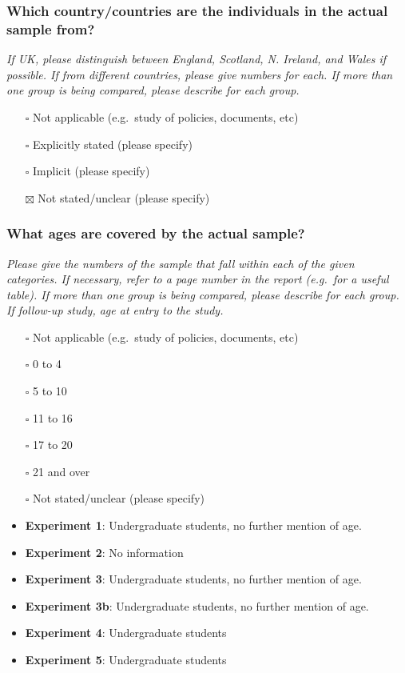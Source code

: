 \documentclass[
  doc, a4paper]{apa7}
\providecommand{\tightlist}{%
  \setlength{\itemsep}{0pt}\setlength{\parskip}{0pt}}
\begin{document}
\subsubsection{Which country/countries are the individuals in the actual sample from?}\label{which-countrycountries-are-the-individuals-in-the-actual-sample-from}

\emph{If UK, please distinguish between England, Scotland, N. Ireland, and Wales if possible. If from different countries, please give numbers for each. If more than one group is being compared, please describe for each group.}

\begin{itemize}
\tightlist
\item[$\square$]
  Not applicable (e.g.~study of policies, documents, etc)
\item[$\square$]
  Explicitly stated (please specify)
\item[$\square$]
  Implicit (please specify)
\item[$\boxtimes$]
  Not stated/unclear (please specify)
\end{itemize}

\subsubsection{What ages are covered by the actual sample?}\label{what-ages-are-covered-by-the-actual-sample}

\emph{Please give the numbers of the sample that fall within each of the given categories. If necessary, refer to a page number in the report (e.g.~for a useful table). If more than one group is being compared, please describe for each group. If follow-up study, age at entry to the study.}

\begin{itemize}
\item[$\square$]
  Not applicable (e.g.~study of policies, documents, etc)
\item[$\square$]
  0 to 4
\item[$\square$]
  5 to 10
\item[$\square$]
  11 to 16
\item[$\square$]
  17 to 20
\item[$\square$]
  21 and over
\item[$\square$]
  Not stated/unclear (please specify)
\item
  \textbf{Experiment 1}: Undergraduate students, no further mention of age.\\
\item
  \textbf{Experiment 2}: No information
\item
  \textbf{Experiment 3}: Undergraduate students, no further mention of age.
\item
  \textbf{Experiment 3b}: Undergraduate students, no further mention of age.
\item
  \textbf{Experiment 4}: Undergraduate students
\item
  \textbf{Experiment 5}: Undergraduate students
\end{itemize}
\end{document}
